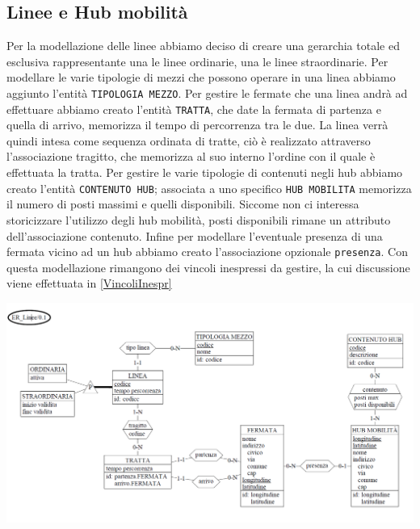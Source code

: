 \documentclass[12pt,a4paper]{report}
\begin{document}
\subsection{Linee e Hub mobilità}
Per la modellazione delle linee abbiamo deciso di creare una gerarchia totale ed esclusiva rappresentante una le linee ordinarie, una le linee straordinarie. Per modellare le varie tipologie di mezzi che possono operare in una linea abbiamo aggiunto l'entità \texttt{TIPOLOGIA MEZZO}. Per gestire le  fermate che una linea andrà ad effettuare abbiamo creato l'entità \texttt{TRATTA}, che date la fermata di partenza e quella di arrivo, memorizza il tempo di percorrenza tra le due. La linea verrà quindi intesa come sequenza ordinata di tratte, ciò è realizzato attraverso l'associazione tragitto, che memorizza al suo interno l'ordine con il quale è effettuata la tratta. Per gestire le varie tipologie di contenuti negli hub abbiamo creato l'entità \texttt{CONTENUTO HUB}; associata a uno specifico \texttt{HUB MOBILITA} memorizza il numero di posti massimi e quelli disponibili. Siccome non ci interessa storicizzare l'utilizzo degli hub mobilità, posti disponibili rimane un attributo dell'associazione contenuto. Infine per modellare l'eventuale presenza di una fermata vicino ad un hub abbiamo creato l'associazione opzionale \texttt{presenza}.
Con questa modellazione rimangono dei vincoli inespressi da gestire, la cui discussione viene effettuata in \autoref{VincoliInespr}\\
\begin{centering}
\includegraphics[width=1.0\textwidth]{prog_conc/Linee}
\end{centering}
\end{document}
